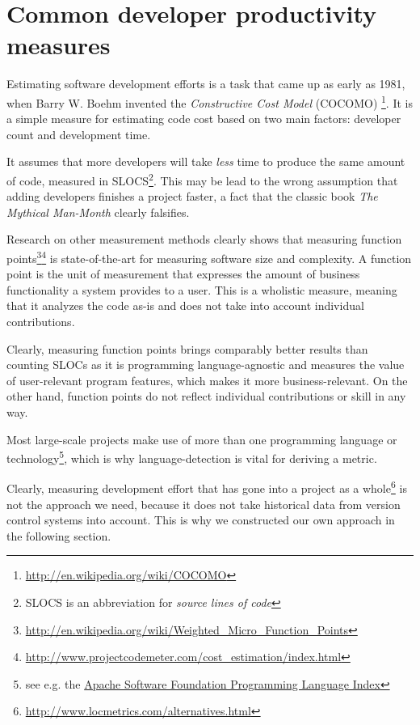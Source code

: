 \section{Common developer productivity measures}
Estimating software development efforts is a task that
came up as early as 1981, when Barry W. Boehm invented the \textit{
Constructive Cost Model} (COCOMO)
\footnote{\url{http://en.wikipedia.org/wiki/COCOMO}}.
It is a simple measure for estimating code cost
based on two main factors: developer count and development time.
\newline

It assumes that more developers will take \textit{less} time to produce the
same amount of code, measured in SLOCS\footnote{SLOCS is an abbreviation for
\textit{source lines of code}}. This may be lead to the wrong assumption that
adding developers finishes a project faster, a fact that the
classic book \textit{The Mythical Man-Month}\cite{fb:1975} clearly falsifies.
\newline

Research on other measurement methods clearly shows that measuring
function points\footnote{\url{http://en.wikipedia.org/wiki/Weighted_Micro_Function_Points}}\footnote{\url{http://www.projectcodemeter.com/cost_estimation/index.html}}
is state-of-the-art for measuring software size and complexity.
A function point is the unit of measurement that expresses the amount of
business functionality a system provides to a user. This is a wholistic
measure, meaning that it analyzes the code as-is and does not take into
account individual contributions.

Clearly, measuring function points brings comparably better results
than counting SLOCs as it is programming language-agnostic and measures
the value of user-relevant program features, which makes it more
business-relevant.
On the other hand, function points do not reflect individual
contributions or skill in any way.

Most large-scale projects make use of more than one programming language
or technology\footnote{see e.g. the \href{http://projects.apache.org/indexes/language.html}{Apache Software Foundation Programming Language Index}},
which is why language-detection is vital for deriving a metric.
\newline

Clearly, measuring development effort that has gone into a project as a whole\footnote{\url{http://www.locmetrics.com/alternatives.html}}
is not the approach we need, because it does not take historical data from
version control systems  into account. This is why we constructed our own
approach in the following section.

